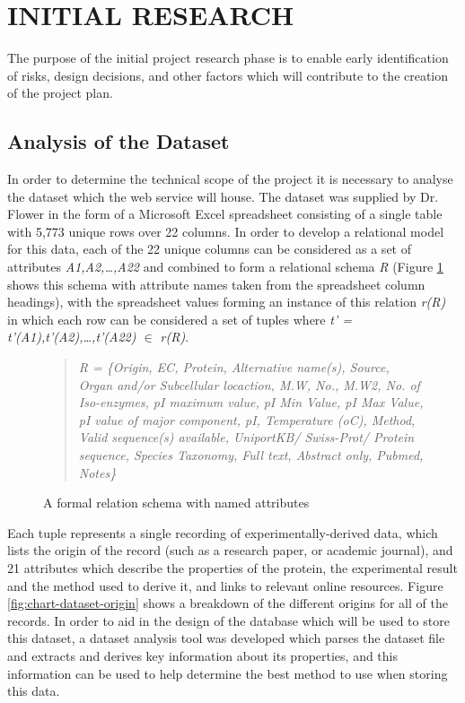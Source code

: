 \newpage
\section{INITIAL RESEARCH \hrulefill}

The purpose of the initial project research phase is to enable early
identification of risks, design decisions, and other factors which will
contribute to the creation of the project plan.

\subsection{Analysis of the Dataset}

In order to determine the technical scope of the project it is necessary to
analyse the dataset which the web service will house. The dataset was supplied
by Dr. Flower in the form of a Microsoft Excel spreadsheet consisting of a
single table with 5,773 unique rows over 22 columns. In order to develop a
relational model for this data, each of the 22 unique columns can be considered
as a set of attributes \textit{A1,A2,\ldots,A22} and combined to form a
relational schema \textit{R} (Figure \ref{fig:formal-schema-names-attributes}
shows this schema with attribute names taken from the spreadsheet column
headings), with the spreadsheet values forming an instance of this relation
\textit{r(R)} in which each row can be considered a set of tuples where
\textit{t' = {t'(A1),t'(A2),\ldots,t'(A22)} $\in$ r(R)}.

\begin{figure}[H]
\centering
\begin{quote}
\textit{R = \{Origin, EC, Protein, Alternative name(s), Source, Organ and/or
  Subcellular locaction, M.W, No., M.W2, No. of Iso-enzymes, pI maximum value,
  pI Min Value, pI Max Value, pI value of major component, pI, Temperature (oC),
  Method, Valid sequence(s) available, UniportKB/ Swiss-Prot/ Protein sequence,
  Species Taxonomy, Full text, Abstract only, Pubmed, Notes\}}
\end{quote}
\caption{A formal relation schema with named attributes}
\label{fig:formal-schema-names-attributes}
\end{figure}

Each tuple represents a single recording of experimentally-derived data, which
lists the origin of the record (such as a research paper, or academic journal),
and 21 attributes which describe the properties of the protein, the experimental
result and the method used to derive it, and links to relevant online
resources. Figure \ref{fig:chart-dataset-origin} shows a breakdown of the
different origins for all of the records. In order to aid in the design of the
database which will be used to store this dataset, a dataset analysis tool was
developed which parses the dataset file and extracts and derives key information
about its properties, and this information can be used to help determine the
best method to use when storing this data.

